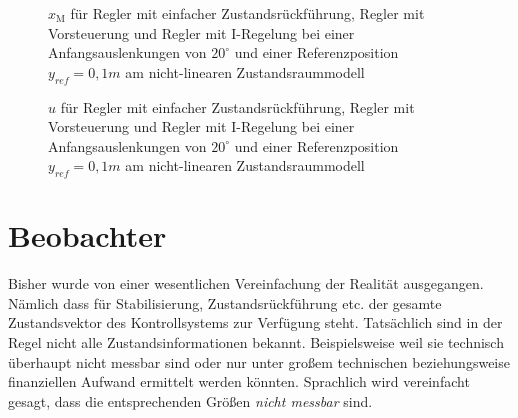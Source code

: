\documentclass[
	pagesize,
	fontsize=12pt,
	paper=a4,
	oneside,
   reqno
]{scrartcl}
\newcommand{\etc}{etc.\xspace}
\begin{document}
\begin{figure}[H]
    \centering
    \caption[Reglervergleich für $x_{\mathrm{M}}$ (nicht-linear)]{$x_{\mathrm{M}}$ für Regler mit einfacher Zustandsrückführung, Regler mit Vorsteuerung und Regler mit I-Regelung bei einer Anfangsauslenkungen von $20^\circ$ und einer Referenzposition $y_{ref} = 0,1 m$ am nicht-linearen Zustandsraummodell}
    \label{fig:Bild31}
\end{figure}

\begin{figure}[H]
    \centering
    \caption[Reglervergleich für $u$ (nicht-linear)]{$u$ für Regler mit einfacher Zustandsrückführung, Regler mit Vorsteuerung und Regler mit I-Regelung bei einer Anfangsauslenkungen von $20^\circ$ und einer Referenzposition $y_{ref} = 0,1 m$ am nicht-linearen Zustandsraummodell}
    \label{fig:Bild32}
\end{figure}

\clearpage

\section{Beobachter}

Bisher wurde von einer wesentlichen Vereinfachung der Realität ausgegangen. Nämlich dass für Stabilisierung, Zustandsrückführung \etc der gesamte Zustandsvektor des Kontrollsystems zur Verfügung steht. Tatsächlich sind in der Regel nicht alle Zustandsinformationen bekannt. Beispielsweise weil sie technisch überhaupt nicht messbar sind oder nur unter großem technischen beziehungsweise finanziellen Aufwand ermittelt werden könnten. Sprachlich wird
vereinfacht gesagt, dass die entsprechenden Größen \textit{nicht messbar} sind.
\end{document}
